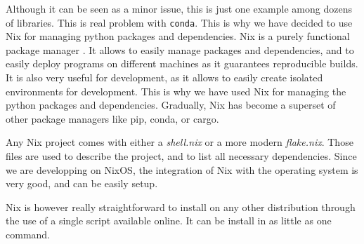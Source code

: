     Although it can be seen as a minor issue, this is just one example among dozens of libraries. This is real problem with \texttt{conda}. This is why we have decided to use Nix for managing python packages and dependencies. Nix is a purely functional package manager \cite{NixOriginalThesis06}. It allows to easily manage packages and dependencies, and to easily deploy programs on different machines as it guarantees reproducible builds. It is also very useful for development, as it allows to easily create isolated environments for development. This is why we have used Nix for managing the python packages and dependencies. Gradually, Nix has become a superset of other package managers like pip, conda, or cargo. 
    
    Any Nix project comes with either a \textit{shell.nix} or a more modern \textit{flake.nix}. Those files are used to describe the project, and to list all necessary dependencies. Since we are developping on NixOS, the integration of Nix with the operating system is very good, and can be easily setup.
    
    Nix is however really straightforward to install on any other distribution through the use of a single script available online. It can be install in as little as one command.






